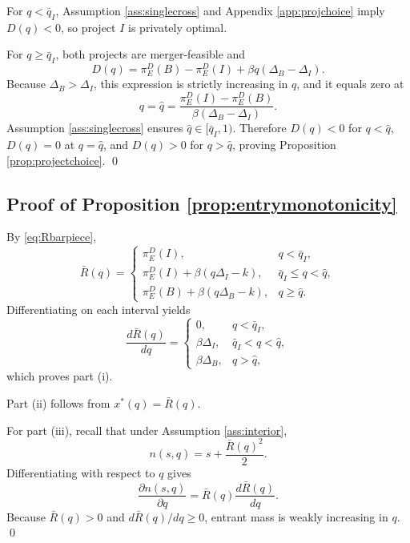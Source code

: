For \(q<\bar q_I\), Assumption \ref{ass:singlecross} and Appendix \ref{app:projchoice} imply \(D(q)<0\), so project \(I\) is privately optimal.

For \(q\ge \bar q_I\), both projects are merger-feasible and
\begin{equation}
    D(q)
    =
    \pi_E^D(B)-\pi_E^D(I)+\beta q(\Delta_B-\Delta_I).
\end{equation}
Because \(\Delta_B>\Delta_I\), this expression is strictly increasing in \(q\), and it equals zero at
\begin{equation}
    q=\hat q
    =
    \frac{\pi_E^D(I)-\pi_E^D(B)}
         {\beta(\Delta_B-\Delta_I)}.
\end{equation}
Assumption \ref{ass:singlecross} ensures \(\hat q \in [\bar q_I,1)\).
Therefore \(D(q)<0\) for \(q<\hat q\), \(D(q)=0\) at \(q=\hat q\), and \(D(q)>0\) for \(q>\hat q\), proving Proposition \ref{prop:projectchoice}. \qed

\subsection{Proof of Proposition \ref{prop:entrymonotonicity}}

By \eqref{eq:Rbarpiece},
\begin{equation}
    \bar R(q)
    =
    \begin{cases}
        \pi_E^D(I), &
        q < \bar q_I, \\
        \pi_E^D(I)+\beta(q\Delta_I-k), &
        \bar q_I \le q < \hat q, \\
        \pi_E^D(B)+\beta(q\Delta_B-k), &
        q \ge \hat q.
    \end{cases}
\end{equation}
Differentiating on each interval yields
\begin{equation}
    \frac{d\bar R(q)}{dq}
    =
    \begin{cases}
        0, & q < \bar q_I, \\
        \beta \Delta_I, & \bar q_I < q < \hat q, \\
        \beta \Delta_B, & q > \hat q,
    \end{cases}
\end{equation}
which proves part (i).

Part (ii) follows from \(x^*(q)=\bar R(q)\).

For part (iii), recall that under Assumption \ref{ass:interior},
\begin{equation}
    n(s,q)=s+\frac{\bar R(q)^2}{2}.
\end{equation}
Differentiating with respect to \(q\) gives
\begin{equation}
    \frac{\partial n(s,q)}{\partial q}
    =
    \bar R(q)\frac{d\bar R(q)}{dq}.
\end{equation}
Because \(\bar R(q)>0\) and \(d\bar R(q)/dq \ge 0\), entrant mass is weakly increasing in \(q\). \qed

